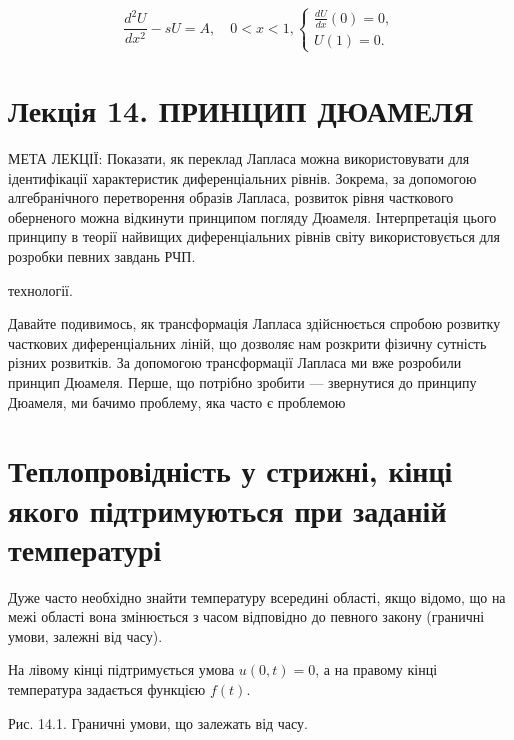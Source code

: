 \documentclass[
  ukrainian,
]{article}
\begin{document}
\[
\frac{d^2U}{dx^2} - sU = A, \quad 0 < x < 1,
\begin{cases}
\frac{dU}{dx}(0) = 0, \\
U(1) = 0.
\end{cases}
\]

\section{Лекція 14. ПРИНЦИП
ДЮАМЕЛЯ}\label{ux43bux435ux43aux446ux456ux44f-14.-ux43fux440ux438ux43dux446ux438ux43f-ux434ux44eux430ux43cux435ux43bux44f}

МЕТА ЛЕКЦІЇ: Показати, як переклад Лапласа можна використовувати для
ідентифікації характеристик диференціальних рівнів. Зокрема, за
допомогою алгебранічного перетворення образів Лапласа, розвиток рівня
часткового оберненого можна відкинути принципом погляду Дюамеля.
Інтерпретація цього принципу в теорії найвищих диференціальних рівнів
світу використовується для розробки певних завдань РЧП.

технології.

Давайте подивимось, як трансформація Лапласа здійснюється спробою
розвитку часткових диференціальних ліній, що дозволяє нам розкрити
фізичну сутність різних розвитків. За допомогою трансформації Лапласа ми
вже розробили принцип Дюамеля. Перше, що потрібно зробити --- звернутися
до принципу Дюамеля, ми бачимо проблему, яка часто є проблемою

\section{Теплопровідність у стрижні, кінці якого підтримуються при
заданій
температурі}\label{ux442ux435ux43fux43bux43eux43fux440ux43eux432ux456ux434ux43dux456ux441ux442ux44c-ux443-ux441ux442ux440ux438ux436ux43dux456-ux43aux456ux43dux446ux456-ux44fux43aux43eux433ux43e-ux43fux456ux434ux442ux440ux438ux43cux443ux44eux442ux44cux441ux44f-ux43fux440ux438-ux437ux430ux434ux430ux43dux456ux439-ux442ux435ux43cux43fux435ux440ux430ux442ux443ux440ux456}

Дуже часто необхідно знайти температуру всередині області, якщо відомо,
що на межі області вона змінюється з часом відповідно до певного закону
(граничні умови, залежні від часу).

На лівому кінці підтримується умова \(u(0,t)=0\), а на правому кінці
температура задається функцією \(f(t)\).

Рис. 14.1. Граничні умови, що залежать від часу.
\end{document}
